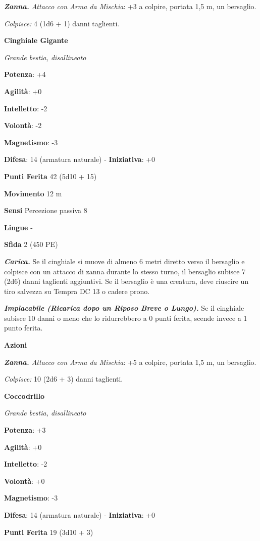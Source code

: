 \begin{multicols}{2}
\emph{\textbf{Zanna.} Attacco con Arma da Mischia}: +3 a colpire,
portata 1,5 m, un bersaglio.

\emph{Colpisce:} 4 (1d6 + 1) danni taglienti.

\textbf{Cinghiale Gigante}

\emph{Grande bestia, disallineato}

\textbf{Potenza}: +4

\textbf{Agilità}: +0

\textbf{Intelletto}: -2

\textbf{Volontà}: -2

\textbf{Magnetismo}: -3

\textbf{Difesa}: 14 (armatura naturale) - \textbf{Iniziativa}: +0

\textbf{Punti Ferita} 42 (5d10 + 15)

\textbf{Movimento} 12 m

\textbf{Sensi} Percezione passiva 8

\textbf{Lingue} -

\textbf{Sfida} 2 (450 PE)

\emph{\textbf{Carica.}} Se il cinghiale si muove di almeno 6 metri
diretto verso il bersaglio e colpisce con un attacco di zanna durante lo
stesso turno, il bersaglio subisce 7 (2d6) danni taglienti aggiuntivi.
Se il bersaglio è una creatura, deve riuscire un tiro salvezza su Tempra
DC 13 o cadere prono.

\emph{\textbf{Implacabile (Ricarica dopo un Riposo Breve o Lungo).}} Se
il cinghiale subisce 10 danni o meno che lo ridurrebbero a 0 punti
ferita, scende invece a 1 punto ferita.

\textbf{Azioni}

\emph{\textbf{Zanna.} Attacco con Arma da Mischia}: +5 a colpire,
portata 1,5 m, un bersaglio.

\emph{Colpisce:} 10 (2d6 + 3) danni taglienti.



\textbf{Coccodrillo}

\emph{Grande bestia, disallineato}

\textbf{Potenza}: +3

\textbf{Agilità}: +0

\textbf{Intelletto}: -2

\textbf{Volontà}: +0

\textbf{Magnetismo}: -3

\textbf{Difesa}: 14 (armatura naturale) - \textbf{Iniziativa}: +0

\textbf{Punti Ferita} 19 (3d10 + 3)


\end{multicols}
